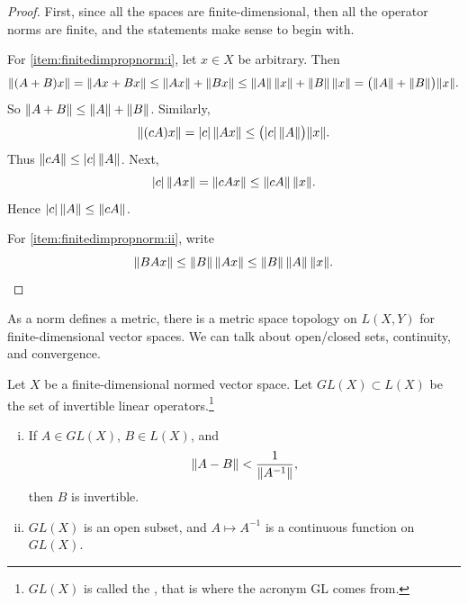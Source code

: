 \begin{proof}
First, since all the spaces are finite-dimensional, then all the operator
norms are finite, and the statements make sense to begin with.

For \ref{item:finitedimpropnorm:i}, let $x \in X$ be arbitrary.  Then
\begin{equation*}
\lVert {(A+B)x} \rVert =
\lVert {Ax+Bx} \rVert \leq
\lVert {Ax} \rVert+\lVert {Bx} \rVert \leq
\lVert {A} \rVert \, \lVert {x} \rVert+\lVert {B} \rVert \,\lVert {x} \rVert =
\bigl(\lVert {A} \rVert+\lVert {B} \rVert\bigr) \lVert {x} \rVert .
\end{equation*}
So $\lVert {A+B} \rVert \leq \lVert {A} \rVert+\lVert {B} \rVert$.
Similarly,
\begin{equation*}
\lVert {(cA)x} \rVert =
\lvert {c} \rvert \, \lVert {Ax} \rVert \leq \bigl(\lvert {c} \rvert \,\lVert {A} \rVert\bigr) \lVert {x} \rVert .
\end{equation*}
Thus $\lVert {cA} \rVert \leq \lvert {c} \rvert \, \lVert {A} \rVert$.  Next,
\begin{equation*}
\lvert {c} \rvert \,  \lVert {Ax} \rVert
=
\lVert {cAx} \rVert \leq \lVert {cA} \rVert \, \lVert {x} \rVert .
\end{equation*}
Hence $\lvert {c} \rvert \, \lVert {A} \rVert \leq \lVert {cA} \rVert$.


For \ref{item:finitedimpropnorm:ii}, write
\begin{equation*}
\lVert {BAx} \rVert \leq \lVert {B} \rVert \, \lVert {Ax} \rVert \leq \lVert {B} \rVert \, \lVert {A} \rVert \, \lVert {x} \rVert .
\qedhere
\end{equation*}
\end{proof}

As a norm defines a metric,
there is
a metric space topology on $L(X,Y)$ for finite-dimensional vector spaces.
We can talk
about open/closed sets, continuity, and convergence.

\begin{prop} \label{prop:finitedimpropinv}
Let $X$ be a finite-dimensional normed vector space.
Let $GL(X) \subset L(X)$ be the set of invertible linear
operators.\footnote{$GL(X)$ is called the
\emph{}, that is where the acronym GL
comes from.}
\begin{enumerate}[(i)]
\item \label{finitedimpropinv:i}
If $A \in GL(X)$, $B \in L(X)$, and
\begin{equation} \label{eqcontineq}
\lVert {A-B} \rVert <  \frac{1}{\lVert {A^{-1}} \rVert},
\end{equation}
then $B$ is invertible.
\item \label{finitedimpropinv:ii}
$GL(X)$ is an open subset, and $A \mapsto A^{-1}$ is a continuous
function on $GL(X)$.
\end{enumerate}
\end{prop}

